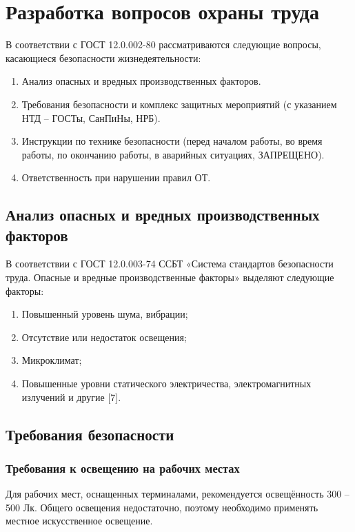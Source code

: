 \section{Разработка вопросов охраны труда}

В соответствии с ГОСТ 12.0.002-80 рассматриваются следующие вопросы, касающиеся безопасности жизнедеятельности:

\begin{enumerate}
 \item Анализ опасных и вредных производственных факторов.
 \item Требования безопасности и комплекс защитных мероприятий (с указанием НТД – ГОСТы, СанПиНы, НРБ).
 \item Инструкции по технике безопасности (перед началом работы, во время работы, по окончанию работы, в аварийных ситуациях, ЗАПРЕЩЕНО).
 \item Ответственность при нарушении правил ОТ. 
\end{enumerate}

\subsection{Анализ опасных и вредных производственных факторов}

В соответствии с ГОСТ 12.0.003-74 ССБТ «Система стандартов безопасности труда. Опасные и вредные производственные факторы» выделяют следующие факторы:

\begin{enumerate}
 \item Повышенный уровень шума, вибрации;
 \item Отсутствие или недостаток освещения;
 \item Микроклимат;
 \item Повышенные уровни статического электричества, электромагнитных излучений и другие [7].
\end{enumerate}

\subsection{Требования безопасности}

\subsubsection{Требования к освещению на рабочих местах}

Для рабочих мест, оснащенных терминалами, рекомендуется освещённость 300 – 500 Лк. Общего освещения недостаточно, поэтому необходимо применять местное искусственное освещение.

